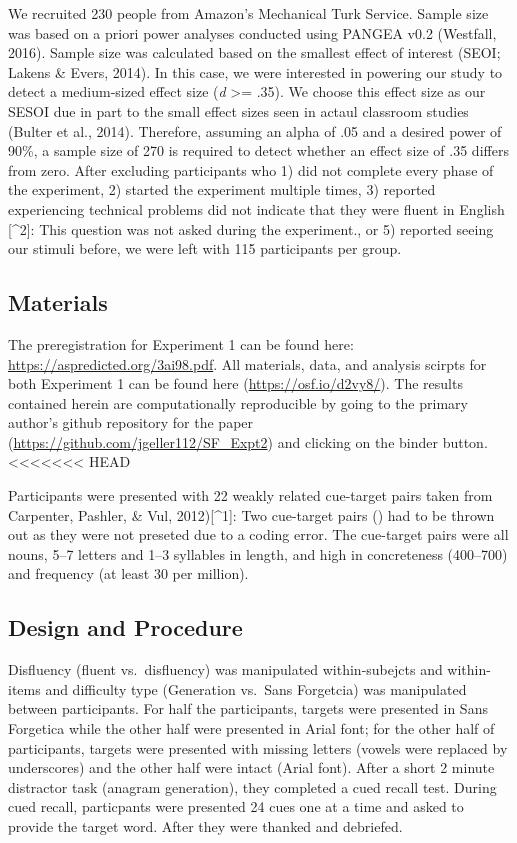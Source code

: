 \documentclass[pdf]{apa6}
\begin{document}
We recruited 230 people from Amazon's Mechanical Turk Service. Sample size was based on a priori power analyses conducted using PANGEA v0.2 (Westfall, 2016). Sample size was calculated based on the smallest effect of interest (SEOI; Lakens \& Evers, 2014). In this case, we were interested in powering our study to detect a medium-sized effect size (\emph{d} \textgreater{}= .35). We choose this effect size as our SESOI due in part to the small effect sizes seen in actaul classroom studies (Bulter et al., 2014). Therefore, assuming an alpha of .05 and a desired power of 90\%, a sample size of 270 is required to detect whether an effect size of .35 differs from zero. After excluding participants who 1) did not complete every phase of the experiment, 2) started the experiment multiple times, 3) reported experiencing technical problems did not indicate that they were fluent in English {[}\^{}2{]}: This question was not asked during the experiment., or 5) reported seeing our stimuli before, we were left with 115 participants per group.

\hypertarget{materials}{%
\subsection{Materials}\label{materials}}

The preregistration for Experiment 1 can be found here: \url{https://aspredicted.org/3ai98.pdf}. All materials, data, and analysis scirpts for both Experiment 1 can be found here (\url{https://osf.io/d2vy8/}). The results contained herein are computationally reproducible by going to the primary author's github repository for the paper (\url{https://github.com/jgeller112/SF_Expt2}) and clicking on the binder button.
<<<<<<< HEAD

Participants were presented with 22 weakly related cue-target pairs taken from Carpenter, Pashler, \& Vul, 2012){[}\^{}1{]}: Two cue-target pairs () had to be thrown out as they were not preseted due to a coding error. The cue-target pairs were all nouns, 5--7 letters and 1--3 syllables in length, and high in concreteness (400--700) and frequency (at least 30 per million).

\hypertarget{design-and-procedure}{%
\subsection{Design and Procedure}\label{design-and-procedure}}

Disfluency (fluent vs.~disfluency) was manipulated within-subejcts and within-items and difficulty type (Generation vs.~Sans Forgetcia) was manipulated between participants. For half the participants, targets were presented in Sans Forgetica while the other half were presented in Arial font; for the other half of participants, targets were presented with missing letters (vowels were replaced by underscores) and the other half were intact (Arial font). After a short 2 minute distractor task (anagram generation), they completed a cued recall test. During cued recall, particpants were presented 24 cues one at a time and asked to provide the target word. After they were thanked and debriefed.
\end{document}
